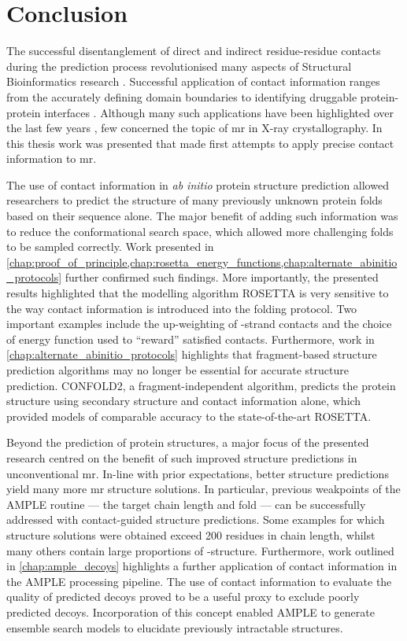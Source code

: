 \section{Conclusion}
The successful disentanglement of direct and indirect residue-residue contacts during the prediction process revolutionised many aspects of Structural Bioinformatics research \cite{Simkovic2017-xs}. Successful application of contact information ranges from the accurately defining domain boundaries \cite{Sadowski2013-zu} to identifying druggable protein-protein interfaces \cite{Bai2016-sw}. Although many such applications have been highlighted over the last few years \cite{Simkovic2017-xs}, few concerned the topic of \gls{mr} in X-ray crystallography. In this thesis work was presented that made first attempts to apply precise contact information to \gls{mr}.

The use of contact information in \textit{ab initio} protein structure prediction allowed researchers to predict the structure of many previously unknown protein folds based on their sequence alone. The major benefit of adding such information was to reduce the conformational search space, which allowed more challenging folds to be sampled correctly. Work presented in \cref{chap:proof_of_principle,chap:rosetta_energy_functions,chap:alternate_abinitio_protocols} further confirmed such findings. More importantly, the presented results highlighted that the modelling algorithm ROSETTA is very sensitive to the way contact information is introduced into the folding protocol. Two important examples include the up-weighting of \textbeta-strand contacts and the choice of energy function used to ``reward'' satisfied contacts. Furthermore, work in \cref{chap:alternate_abinitio_protocols} highlights that fragment-based structure prediction algorithms may no longer be essential for accurate structure prediction. CONFOLD2, a fragment-independent algorithm, predicts the protein structure using secondary structure and contact information alone, which provided models of comparable accuracy to the state-of-the-art ROSETTA.

Beyond the prediction of protein structures, a major focus of the presented research centred on the benefit of such improved structure predictions in unconventional \gls{mr}. In-line with prior expectations, better structure predictions yield many more \gls{mr} structure solutions. In particular, previous weakpoints of the AMPLE routine --- the target chain length and fold --- can be successfully addressed with contact-guided structure predictions. Some examples for which structure solutions were obtained exceed 200 residues in chain length, whilst many others contain large proportions of \textbeta-structure. Furthermore, work outlined in \cref{chap:ample_decoys} highlights a further application of contact information in the AMPLE processing pipeline. The use of contact information to evaluate the quality of predicted decoys proved to be a useful proxy to exclude poorly predicted decoys. Incorporation of this concept enabled AMPLE to generate ensemble search models to elucidate previously intractable structures.

